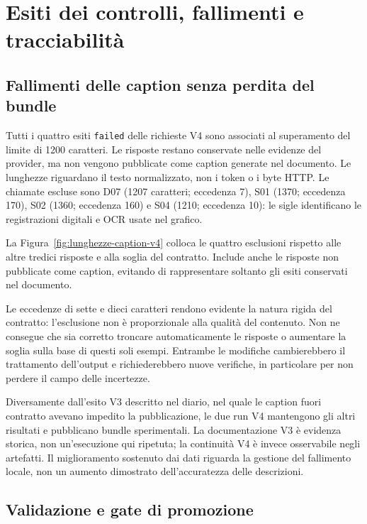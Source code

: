 \section{Esiti dei controlli, fallimenti e tracciabilità}
\label{sec:errori}

\subsection{Fallimenti delle caption senza perdita del bundle}

Tutti i quattro esiti \texttt{failed} delle richieste V4 sono associati al superamento del limite di 1200 caratteri. Le risposte restano conservate nelle evidenze del provider, ma non vengono pubblicate come caption generate nel documento. Le lunghezze riguardano il testo normalizzato, non i token o i byte HTTP. Le chiamate escluse sono D07 (1207 caratteri; eccedenza 7), S01 (1370; eccedenza 170), S02 (1360; eccedenza 160) e S04 (1210; eccedenza 10): le sigle identificano le registrazioni digitali e OCR usate nel grafico.

La Figura~\ref{fig:lunghezze-caption-v4} colloca le quattro esclusioni rispetto alle altre tredici risposte e alla soglia del contratto. Include anche le risposte non pubblicate come caption, evitando di rappresentare soltanto gli esiti conservati nel documento.



Le eccedenze di sette e dieci caratteri rendono evidente la natura rigida del contratto: l'esclusione non è proporzionale alla qualità del contenuto. Non ne consegue che sia corretto troncare automaticamente le risposte o aumentare la soglia sulla base di questi soli esempi. Entrambe le modifiche cambierebbero il trattamento dell'output e richiederebbero nuove verifiche, in particolare per non perdere il campo delle incertezze.

Diversamente dall'esito V3 descritto nel diario, nel quale le caption fuori contratto avevano impedito la pubblicazione, le due run V4 mantengono gli altri risultati e pubblicano bundle sperimentali. La documentazione V3 è evidenza storica, non un'esecuzione qui ripetuta; la continuità V4 è invece osservabile negli artefatti. Il miglioramento sostenuto dai dati riguarda la gestione del fallimento locale, non un aumento dimostrato dell'accuratezza delle descrizioni.

\FloatBarrier
\subsection{Validazione e gate di promozione}

